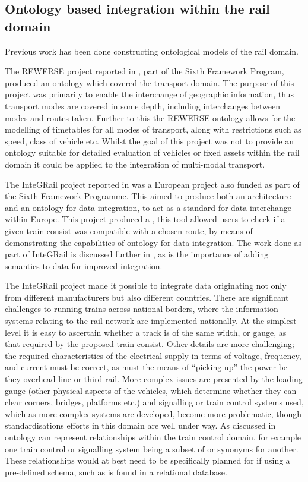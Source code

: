 \subsection{Ontology based integration within the rail domain}
\label{sec:prevonto}
Previous work has been done constructing ontological models of the rail domain.

The REWERSE project reported in \citet{Lorenz2005a}, part of the Sixth Framework Program, produced an ontology which covered the transport domain. The purpose of this project was primarily to enable the interchange of geographic information, thus transport modes are covered in some depth, including interchanges between modes and routes taken. Further to this the REWERSE ontology allows for the modelling of timetables for all modes of transport, along with restrictions such as speed, class of vehicle etc. Whilst the goal of this project was not to provide an ontology suitable for detailed evaluation of vehicles or fixed assets within the rail domain it could be applied to the integration of multi-modal transport.

The InteGRail project reported in \citet{Kopf2010} was a European project also funded as part of the Sixth Framework Programme. This aimed to produce both an architecture and an ontology for data integration, to act as a standard for data interchange within Europe. This project produced a , this tool allowed users to check if a given train consist was compatible with a chosen route, by means of demonstrating the capabilities of ontology for data integration. The work done as part of InteGRail is discussed further in \citet{Verstichel2011}, as is the importance of adding semantics to data for improved integration. 

The InteGRail project made it possible to integrate data originating not only from different manufacturers but also different countries. There are significant challenges to running trains across national borders, where the information systems relating to the rail network are implemented nationally. At the simplest level it is easy to ascertain whether a track is of the same width, or gauge, as that required by the proposed train consist. Other details are more challenging; the required characteristics of the electrical supply in terms of voltage, frequency, and current must be correct, as must the means of ``picking up'' the power be they overhead line or third rail. More complex issues are presented by the loading gauge (other physical aspects of the vehicles, which determine whether they can clear corners, bridges, platforms etc.) and signalling or train control systems used, which as more complex systems are developed, become more problematic, though standardisations efforts in this domain are well under way. As discussed in \citet{Verstichel2011} ontology can represent relationships within the train control domain, for example one train control or signalling system being a subset of or synonyms for another. These relationships would at best need to be specifically planned for if using a pre-defined schema, such as is found in a relational database.

